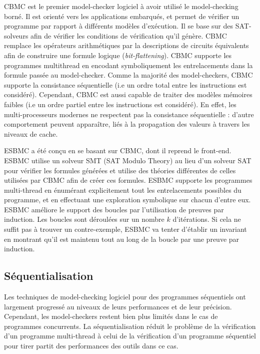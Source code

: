 CBMC\cite{CBMC} est le premier model-checker logiciel à avoir utilisé le
model-checking borné. Il est orienté vers les applications embarqués, et permet
de vérifier un programme par rapport à différents modèles d'exécution. Il se
base sur des SAT-solveurs afin de vérifier les conditions de vérification qu'il
génère. CBMC remplace les opérateurs arithmétiques par la descriptions de
circuits équivalents afin de construire une formule logique
(\emph{bit-flattening}). CBMC supporte les programmes multithread en encodant
symboliquement les entrelacements dans la formule passée au model-checker. Comme
la majorité des model-checkers, CBMC supporte la consistance séquentielle (i.e
un ordre total entre les instructions est considéré). Cependant, CBMC est aussi
capable de traiter des modèles mémoires faibles (i.e un ordre partiel entre les
instructions est considéré). En effet, les multi-processeurs modernes ne
respectent pas la consistance séquentielle : d'autre comportement peuvent
apparaître, liés à la propagation des valeurs à travers les niveaux de cache.

ESBMC\cite{ESBMC} a été conçu en se basant sur CBMC, dont il reprend le
front-end. ESBMC utilise un solveur SMT (SAT Modulo Theory) au lieu d'un solveur
SAT pour vérifier les formules générées et utilise des théories différentes de
celles utilisées par CBMC afin de créer ces formules. ESBMC supporte les
programmes multi-thread en énumérant explicitement tout les entrelacements
possibles du programme, et en effectuant une exploration symbolique sur chacun
d'entre eux. ESBMC améliore le support des boucles par l'utilisation de preuves
par induction\cite{ESBMC_k_induction}. Les boucles sont déroulées sur un nombre
\(k\) d'itérations. Si cela ne suffit pas à trouver un contre-exemple, ESBMC va
tenter d'établir un invariant en montrant qu'il est maintenu tout au long de la
boucle par une preuve par induction.

\subsection{Séquentialisation}

Les techniques de model-checking logiciel pour des programmes séquentiels ont
largement progressé au niveaux de leurs performances et de leur précision.
Cependant, les model-checkers restent bien plus limités dans le cas de
programmes concurrents. La séquentialisation réduit le problème de la
vérification d'un programme multi-thread à celui de la vérification d'un
programme séquentiel pour tirer partit des performances des outils dans ce cas.

